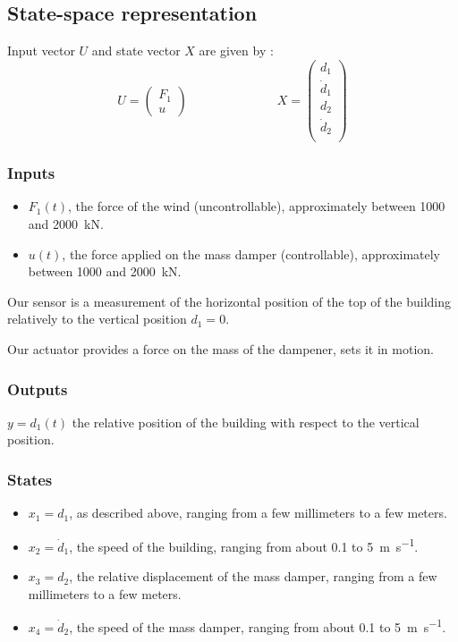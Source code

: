 \subsection{State-space representation}
Input vector $U$ and state vector $X$ are given by :
$$
U = \begin{pmatrix}
    F_1 \\
    u
\end{pmatrix}
\hspace{3cm}
X = \begin{pmatrix}
    d_1 \\
    \dot d_1 \\
    d_2 \\ 
    \dot d_2 \\
\end{pmatrix}
$$

\subsubsection{Inputs}
\begin{itemize}
    \item $F_1(t)$, the force of the wind (uncontrollable), approximately between \num{1000} and \SI{2000}{\kilo\newton}.
    \item $u(t)$, the force applied on the mass damper (controllable), approximately between \num{1000} and \SI{2000}{\kilo\newton}.
\end{itemize}
Our sensor is a measurement of the horizontal position of the top of the building relatively to the vertical position $d_1 = 0$.\par
Our actuator provides a force on the mass of the dampener, sets it in motion.

\subsubsection{Outputs}
$y = d_1(t)$ the relative position of the building with respect to the vertical position.

\subsubsection{States}
\begin{itemize}
    \item $x_1 = d_1$, as described above, ranging from a few millimeters to a few meters.
    \item $x_2 = \dot d_1$, the speed of the building, ranging from about \num{0.1} to \SI{5}{\meter\per\second}.
    \item $x_3 = d_2$, the relative displacement of the mass damper, ranging from a few millimeters to a few meters.
    \item $x_4 = \dot d_2$, the speed of the mass damper, ranging from about \num{0.1} to \SI{5}{\meter\per\second}.
\end{itemize}

